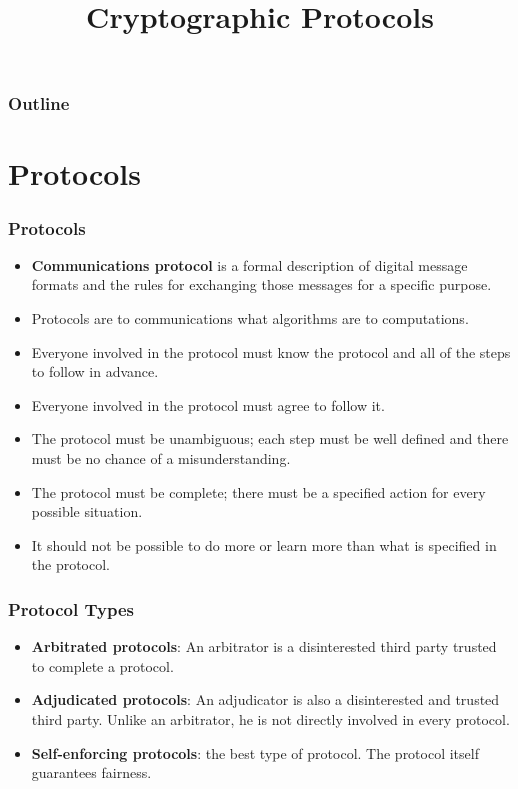 

\title{Cryptographic Protocols}


\maketitle
\begin{frame}
\frametitle{Outline}
\tableofcontents
\end{frame}
\section{Protocols}
\begin{frame}\frametitle{Protocols}
\begin{itemize}
\item \textbf{Communications protocol} is a formal description of digital message formats and the rules for exchanging those messages for a specific purpose.
\item Protocols are to communications what algorithms are to computations.
\item Everyone involved in the protocol must know the protocol and all of the steps to follow in advance.
\item Everyone involved in the protocol must agree to follow it.
\item The protocol must be unambiguous; each step must be well defined and there must be no chance of a misunderstanding.
\item The protocol must be complete; there must be a specified action for every possible situation.
\item It should not be possible to do more or learn more than what is specified in the protocol.
\end{itemize}
\end{frame}
\begin{frame}\frametitle{Protocol Types}
\begin{itemize}
\item \textbf{Arbitrated protocols}: An arbitrator is a disinterested third party trusted to complete a protocol.
\item \textbf{Adjudicated protocols}: An adjudicator is also a disinterested and trusted third party. Unlike an arbitrator, he is not directly involved in every protocol.
\item \textbf{Self-enforcing protocols}: the best type of protocol. The protocol itself guarantees fairness.
\end{itemize}
\end{frame}
